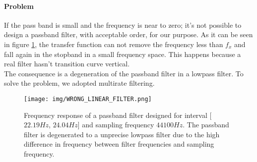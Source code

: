 \paragraph{Problem} 
If the pass band is small and the frequency is near to zero; it's not possible to design a passband filter, with acceptable order, for our purpose. As it can be seen in figure \ref{fig:passbanddegenered}, the transfer function can not remove the frequency less than $f_x$ and fall again in the stopband in a small frequency space. This happens because a real filter hasn't transition curve vertical.\\
The consequence is a degeneration of the passband filter in a lowpass filter. To solve the problem, we adopted multirate filtering.
\begin{figure}[h]
\centering
\texttt{[image: img/WRONG\_LINEAR\_FILTER.png]} 
\caption{Frequency response of a passband filter designed for interval [$22.19Hz$,  $24.04Hz$] and sampling frequency $44100 Hz$. The passband filter is degenerated to a unprecise lowpass filter due to the high difference in frequency between filter frequencies and sampling frequency.} \label{fig:passbanddegenered}
\end{figure}
